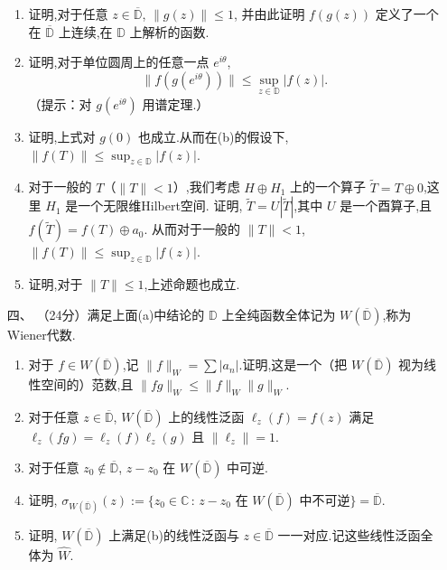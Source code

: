 \begin{enumerate}
\begin{enumerate}[label=(\alph*)]
\item 证明,对于任意 $z\in \overline{\mathbb{D}}$, $\|g(z)\|\leq 1$,
并由此证明 $f(g(z))$ 定义了一个在 $\overline{\mathbb{D}}$ 上连续,在 $\mathbb{D}$ 上解析的函数.

\item 证明,对于单位圆周上的任意一点 $e^{i\theta}$,
$$
\|f(g(e^{i\theta}))\|\leq \sup_{z\in \mathbb{D}} |f(z)|.
$$
（提示：对 $g(e^{i\theta})$ 用谱定理.）

\item 证明,上式对 $g(0)$ 也成立.从而在(b)的假设下, $\|f(T)\|\leq \sup_{z\in \mathbb{D}} |f(z)|$.

\item 对于一般的 $T$（$\|T\|<1$）,我们考虑 $H\oplus H_1$ 上的一个算子 $\tilde{T}=T\oplus 0$,这里 $H_1$ 是一个无限维Hilbert空间.
证明, $\tilde{T}=U|\tilde{T}|$,其中 $U$ 是一个酉算子,且 $f(\tilde{T})=f(T)\oplus a_0$.
从而对于一般的 $\|T\|<1$, $\|f(T)\|\leq \sup_{z\in \mathbb{D}} |f(z)|$.

\item 证明,对于 $\|T\|\leq 1$,上述命题也成立.
\end{enumerate}

\item[四、]（24分）满足上面(a)中结论的 $\mathbb{D}$ 上全纯函数全体记为 $W(\overline{\mathbb{D}})$,称为Wiener代数.

\begin{enumerate}[label=(\alph*)]
\item 对于 $f\in W(\overline{\mathbb{D}})$,记 $\|f\|_W=\sum |a_n|$.证明,这是一个（把 $W(\overline{\mathbb{D}})$ 视为线性空间的）范数,且 $\|fg\|_W\leq \|f\|_W \|g\|_W$.

\item 对于任意 $z\in \overline{\mathbb{D}}$, $W(\overline{\mathbb{D}})$ 上的线性泛函 $\ell_z(f)=f(z)$ 满足 $\ell_z(fg)=\ell_z(f)\ell_z(g)$ 且 $\|\ell_z\|=1$.

\item 对于任意 $z_0\notin \overline{\mathbb{D}}$, $z-z_0$ 在 $W(\overline{\mathbb{D}})$ 中可逆.

\item 证明, $\sigma_{W(\overline{\mathbb{D}})}(z):=\{z_0\in \mathbb{C}\,:\, z-z_0 \text{ 在 } W(\overline{\mathbb{D}}) \text{ 中不可逆}\}=\overline{\mathbb{D}}$.

\item 证明, $W(\overline{\mathbb{D}})$ 上满足(b)的线性泛函与 $z\in \overline{\mathbb{D}}$ 一一对应.记这些线性泛函全体为 $\widehat{W}$.


\end{enumerate}
\end{enumerate}
